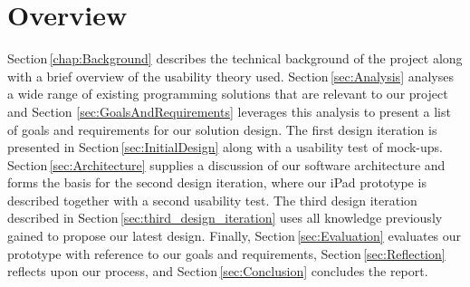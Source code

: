 \section{Overview}
Section\,\ref{chap:Background} describes the technical background of the project along with a brief overview of the usability theory used. Section\,\ref{sec:Analysis} analyses a
wide range of existing programming solutions that are relevant to our project and Section
\ref{sec:GoalsAndRequirements} leverages this analysis to present a list of
goals and requirements for our solution design. The first design
iteration is presented in Section\,\ref{sec:InitialDesign} along with a usability test of mock-ups. Section\,\ref{sec:Architecture}
supplies a discussion of our software architecture and forms the basis for the second design iteration, where our iPad prototype is
described together with a second usability test. The third design iteration described in Section\,\ref{sec:third_design_iteration} uses all knowledge previously gained to propose our latest design. Finally, Section\,\ref{sec:Evaluation}
evaluates our prototype with reference to our goals and requirements, Section\,\ref{sec:Reflection} reflects
upon our process, and Section\,\ref{sec:Conclusion} concludes the report.
